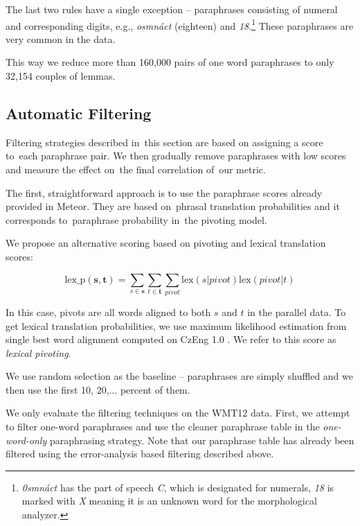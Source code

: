 The last two rules have a single exception -- paraphrases consisting of numeral 
and corresponding digits, e.g., \textit{osmnáct} (eighteen) and \textit{18}.\footnote{
\textit{0smnáct} has the part of speech \textit{C}, which is designated for numerals, 
\textit{18} is marked with \textit{X} meaning it is an unknown word for the 
morphological analyzer.} These paraphrases are very common in the data. 

This way we reduce more than 160,000 pairs of one word paraphrases to only 
32,154 couples of lemmas.

\subsection{Automatic Filtering}
Filtering strategies described in~this section are based on assigning a score 
to~each paraphrase pair. We then gradually remove paraphrases with low scores 
and measure the effect on~the final correlation of~our metric.

The first, straightforward approach is to use the paraphrase scores already
provided in Meteor. They are based on~phrasal translation probabilities
and it corresponds to~paraphrase probability in~the pivoting model.

We propose an alternative scoring based on pivoting and lexical translation
scores:

$$\text{lex\_p}(\mathbf{s},\mathbf{t}) = \sum_{s \in \mathbf{s}}\sum_{t \in
\mathbf{t}}\sum_{pivot}\text{lex}(s|pivot)\text{lex}(pivot|t)$$

In this case, pivots are all words aligned to both $s$ and $t$ in the parallel
data. To get lexical translation probabilities, we use maximum likelihood
estimation from single best word alignment computed on CzEng 1.0
\citep{czeng10:lrec2012}. We refer to this score as \emph{lexical
pivoting}.

We use random selection as the baseline -- paraphrases are simply shuffled and 
we then use the first 10, 20,$\ldots$ percent of them.

We only evaluate the filtering techniques on the WMT12 data. First, we attempt
to filter one-word paraphrases and use the cleaner paraphrase table in the
\emph{one-word-only} paraphrasing strategy. Note that our paraphrase table has
already been filtered using the error-analysis based filtering described above.

